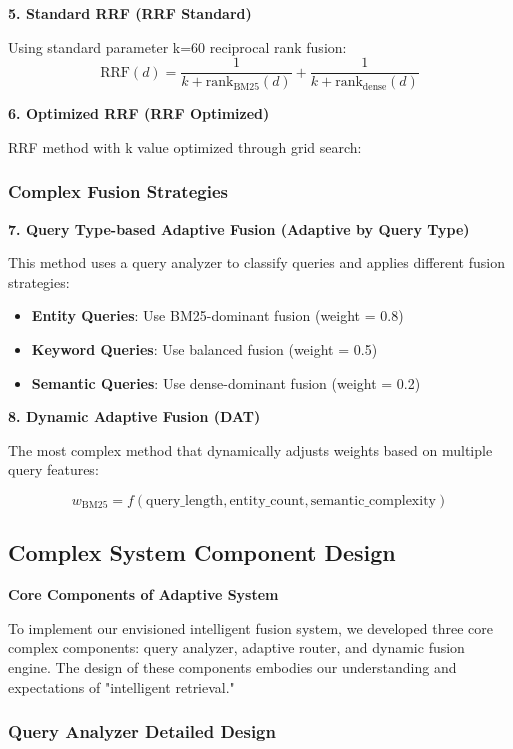 \documentclass[letterpaper]{article} %
\begin{document}
\textbf{5. Standard RRF (RRF Standard)}

Using standard parameter k=60 reciprocal rank fusion:
$$\text{RRF}(d) = \frac{1}{k + \text{rank}_{\text{BM25}}(d)} + \frac{1}{k + \text{rank}_{\text{dense}}(d)}$$

\textbf{6. Optimized RRF (RRF Optimized)}

RRF method with k value optimized through grid search:

\subsubsection{Complex Fusion Strategies}

\textbf{7. Query Type-based Adaptive Fusion (Adaptive by Query Type)}

This method uses a query analyzer to classify queries and applies different fusion strategies:

\begin{itemize}
\item \textbf{Entity Queries}: Use BM25-dominant fusion (weight = 0.8)
\item \textbf{Keyword Queries}: Use balanced fusion (weight = 0.5)
\item \textbf{Semantic Queries}: Use dense-dominant fusion (weight = 0.2)
\end{itemize}

\textbf{8. Dynamic Adaptive Fusion (DAT)}

The most complex method that dynamically adjusts weights based on multiple query features:

$$w_{\text{BM25}} = f(\text{query\_length}, \text{entity\_count}, \text{semantic\_complexity})$$

\subsection{Complex System Component Design}

\textbf{Core Components of Adaptive System}

To implement our envisioned intelligent fusion system, we developed three core complex components: query analyzer, adaptive router, and dynamic fusion engine. The design of these components embodies our understanding and expectations of "intelligent retrieval."

\subsubsection{Query Analyzer Detailed Design}
\end{document}
